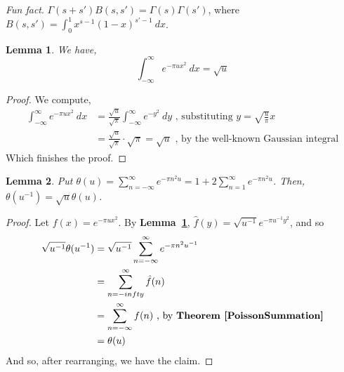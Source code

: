 \documentclass[12pt]{article}
\newcommand{\lref}[1]{\textbf{Lemma~\ref{#1}}}
\newcommand{\tref}[1]{\textbf{Theorem~\ref{#1}}}
\newtheorem{lemma}{Lemma}
\numberwithin{equation}{section}
\numberwithin{thm}{section}
\numberwithin{lemma}{section}
\numberwithin{cor}{section}
\begin{document}
\textit{Fun fact}. $\Gamma(s + s')B(s, s') = \Gamma(s)\Gamma(s')$, where $B(s, s') = \int_0^1 x^{s-1} (1 - x)^{s' - 1} \ dx$.

\begin{lemma}\label{GaussianIntegralEvaluation}
  We have, \begin{equation*}
    \int_{- \infty}^{\infty} e^{-\pi u x^2} \ dx = \sqrt{u}
  \end{equation*}
\end{lemma}
\begin{proof}
  We compute, \begin{align*}
    \int_{-\infty}^{\infty} e^{-\pi u x^2} \ dx &= \frac{\sqrt{u}}{\sqrt{\pi}} \int_{- \infty}^{\infty} e^{-y^2} \ dy \text{ , substituting } y = \sqrt{\frac{u}{\pi}} x \\
    &= \frac{\sqrt{u}}{\sqrt{\pi}} \cdot \sqrt{\pi} = \sqrt{u} \text{ , by the well-known Gaussian integral}
  \end{align*} Which finishes the proof.
\end{proof}

\begin{lemma}\label{ThetaFunctionalEquation}
  Put $\theta(u) = \sum_{n = - \infty}^{\infty} e^{-\pi n^2 u} = 1 + 2 \sum_{n = 1}^{\infty} e^{-\pi n^2 u}$. Then, $\theta(u^{-1}) = \sqrt{u} \theta(u)$.
\end{lemma}
\begin{proof}
  Let $f(x) = e^{-\pi u x^2}$. By \lref{GaussianIntegralEvaluation}, $\hat{f}(y) = \sqrt{u^{-1}} e^{-\pi u^{-1}y^2}$, and so \begin{align*}
    \sqrt{u^{-1}} \theta(u^{-1}) &= \sqrt{u^{-1}} \sum_{n = - \infty}^{\infty} e^{-\pi n^2 u^{-1}} \\
    &= \sum_{n = -infty}^{\infty} \hat{f}(n) \\
    &= \sum_{n = -\infty}^{\infty} f(n) \text{ , by \tref{PoissonSummation}} \\
    &= \theta(u)
  \end{align*} And so, after rearranging, we have the claim.
\end{proof}
\end{document}
